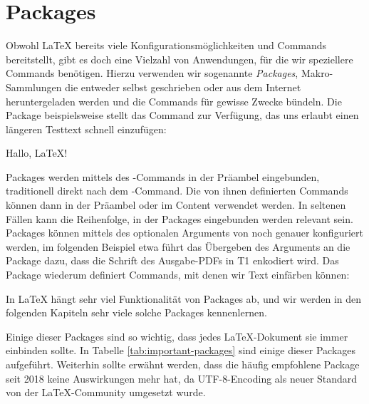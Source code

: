 \section{Packages}
Obwohl \LaTeX{} bereits viele Konfigurationsmöglichkeiten und Commands bereitstellt, gibt es doch eine Vielzahl von Anwendungen, für die wir speziellere Commands benötigen.
Hierzu verwenden wir sogenannte \emph{Packages}, Makro-Sammlungen die entweder selbst geschrieben oder aus dem Internet heruntergeladen werden und die Commands für gewisse Zwecke bündeln.
Die Package  beispielsweise stellt das Command  zur Verfügung, das uns erlaubt einen längeren Testtext schnell einzufügen:
\begin{latexlisting}
	\usepackage{blindtext}
\end{latexlisting}
\begin{latexlisting}
	Hallo, LaTeX!
	\blindtext
\end{latexlisting}
Packages werden mittels des -Commands in der Präambel eingebunden, traditionell direkt nach dem -Command.
Die von ihnen definierten Commands können dann in der Präambel oder im Content verwendet werden.
In seltenen Fällen kann die Reihenfolge, in der Packages eingebunden werden relevant sein.
Packages können mittels des optionalen Arguments von  noch genauer konfiguriert werden, im folgenden Beispiel etwa führt das Übergeben des Arguments  an die Package  dazu, dass die Schrift des Ausgabe-PDFs in T1 enkodiert wird.
Das Package  wiederum definiert Commands, mit denen wir Text einfärben können:
In \LaTeX{} hängt sehr viel Funktionalität von Packages ab, und wir werden in den folgenden Kapiteln sehr viele solche Packages kennenlernen. 

Einige dieser Packages sind so wichtig, dass jedes \LaTeX -Dokument sie immer einbinden sollte.
In Tabelle \autoref{tab:important-packages} sind einige dieser Packages aufgeführt.
Weiterhin sollte erwähnt werden, dass die häufig empfohlene Package  seit 2018 keine Auswirkungen mehr hat, da UTF-8-Encoding als neuer Standard von der \LaTeX -Community umgesetzt wurde.

